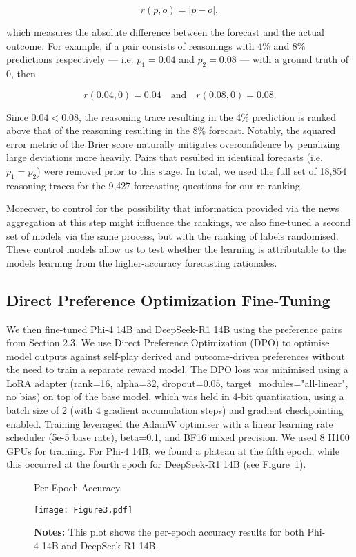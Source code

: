 \documentclass{article}
\begin{document}
\[
r(p,o) = |p - o|,
\]

which measures the absolute difference between the forecast and the actual outcome. For example, if a pair consists of reasonings with 4\% and 8\% predictions respectively --- i.e. $p_1 = 0.04$ and $p_2 = 0.08$ --- with a ground truth of 0, then

\[
r(0.04,0) = 0.04 \quad \text{and} \quad r(0.08,0) = 0.08.
\]

Since $0.04 < 0.08$, the reasoning trace resulting in the 4\% prediction is ranked above that of the reasoning resulting in the 8\% forecast. Notably, the squared error metric of the Brier score naturally mitigates overconfidence by penalizing large deviations more heavily. Pairs that resulted in identical forecasts (i.e. $p_1 = p_2$) were removed prior to this stage. In total, we used the full set of 18,854 reasoning traces for the 9,427 forecasting questions for our re-ranking.

Moreover, to control for the possibility that information provided via the news aggregation at this step might influence the rankings, we also fine-tuned a second set of models via the same process, but with the ranking of labels randomised. These control models allow us to test whether the learning is attributable to the models learning from the higher-accuracy forecasting rationales.


\subsection{Direct Preference Optimization Fine-Tuning}
We then fine-tuned Phi-4 14B and DeepSeek-R1 14B using the preference pairs from Section 2.3. We use Direct Preference Optimization (DPO) to optimise model outputs against self-play derived and outcome-driven preferences without the need to train a separate reward model. The DPO loss was minimised using a LoRA adapter (rank=16, alpha=32, dropout=0.05, target\_modules="all-linear", no bias) on top of the base model, which was held in 4-bit quantisation, using a batch size of 2 (with 4 gradient accumulation steps) and gradient checkpointing enabled. Training leveraged the AdamW optimiser with a linear learning rate scheduler (5e-5 base rate), beta=0.1, and BF16 mixed precision. We used 8 H100 GPUs for training. For Phi-4 14B, we found a plateau at the fifth epoch, while this occurred at the fourth epoch for DeepSeek-R1 14B (see Figure~\ref{fig:per_epoch}).

\begin{figure}[!htbp]
  \centering
  \captionsetup{position=above} %
  \caption{Per-Epoch Accuracy.}
  \texttt{[image: Figure3.pdf]}
  \captionsetup{position=below} %
  \caption*{\textbf{Notes:} This plot shows the per-epoch accuracy results for both Phi-4 14B and DeepSeek-R1 14B.}
  \label{fig:per_epoch}
\end{figure}
\end{document}
